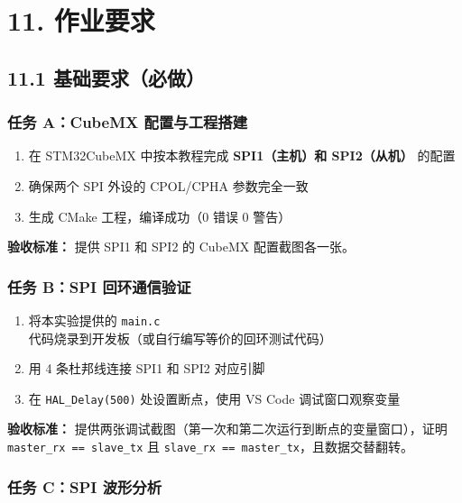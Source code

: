 \documentclass[
  chinese,
  UTF8,
  oneside,
  openany]{ctexbook}
\providecommand{\tightlist}{%
  \setlength{\itemsep}{0pt}\setlength{\parskip}{0pt}}
\begin{document}
\section{11. 作业要求}\label{ux4f5cux4e1aux8981ux6c42-2}

\subsection{11.1
基础要求（必做）}\label{ux57faux7840ux8981ux6c42ux5fc5ux505a-1}

\subsubsection{任务 A：CubeMX
配置与工程搭建}\label{ux4efbux52a1-acubemx-ux914dux7f6eux4e0eux5de5ux7a0bux642dux5efa}

\begin{enumerate}
\def\labelenumi{\arabic{enumi}.}
\tightlist
\item
  在 STM32CubeMX 中按本教程完成 \textbf{SPI1（主机）和 SPI2（从机）}
  的配置
\item
  确保两个 SPI 外设的 CPOL/CPHA 参数完全一致
\item
  生成 CMake 工程，编译成功（0 错误 0 警告）
\end{enumerate}

\textbf{验收标准：} 提供 SPI1 和 SPI2 的 CubeMX 配置截图各一张。

\subsubsection{任务 B：SPI
回环通信验证}\label{ux4efbux52a1-bspi-ux56deux73afux901aux4fe1ux9a8cux8bc1}

\begin{enumerate}
\def\labelenumi{\arabic{enumi}.}
\tightlist
\item
  将本实验提供的 \texttt{main.c}
  代码烧录到开发板（或自行编写等价的回环测试代码）
\item
  用 4 条杜邦线连接 SPI1 和 SPI2 对应引脚
\item
  在 \texttt{HAL\_Delay(500)} 处设置断点，使用 VS Code 调试窗口观察变量
\end{enumerate}

\textbf{验收标准：}
提供两张调试截图（第一次和第二次运行到断点的变量窗口），证明
\texttt{master\_rx\ ==\ slave\_tx} 且
\texttt{slave\_rx\ ==\ master\_tx}，且数据交替翻转。

\subsubsection{任务 C：SPI
波形分析}\label{ux4efbux52a1-cspi-ux6ce2ux5f62ux5206ux6790}
\end{document}
